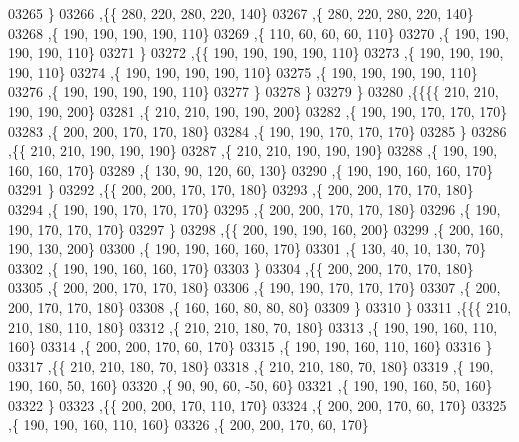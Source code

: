 \begin{DoxyCode}
03265     \}
03266    ,\{\{   280,   220,   280,   220,   140\}
03267     ,\{   280,   220,   280,   220,   140\}
03268     ,\{   190,   190,   190,   190,   110\}
03269     ,\{   110,    60,    60,    60,   110\}
03270     ,\{   190,   190,   190,   190,   110\}
03271     \}
03272    ,\{\{   190,   190,   190,   190,   110\}
03273     ,\{   190,   190,   190,   190,   110\}
03274     ,\{   190,   190,   190,   190,   110\}
03275     ,\{   190,   190,   190,   190,   110\}
03276     ,\{   190,   190,   190,   190,   110\}
03277     \}
03278    \}
03279   \}
03280  ,\{\{\{\{   210,   210,   190,   190,   200\}
03281     ,\{   210,   210,   190,   190,   200\}
03282     ,\{   190,   190,   170,   170,   170\}
03283     ,\{   200,   200,   170,   170,   180\}
03284     ,\{   190,   190,   170,   170,   170\}
03285     \}
03286    ,\{\{   210,   210,   190,   190,   190\}
03287     ,\{   210,   210,   190,   190,   190\}
03288     ,\{   190,   190,   160,   160,   170\}
03289     ,\{   130,    90,   120,    60,   130\}
03290     ,\{   190,   190,   160,   160,   170\}
03291     \}
03292    ,\{\{   200,   200,   170,   170,   180\}
03293     ,\{   200,   200,   170,   170,   180\}
03294     ,\{   190,   190,   170,   170,   170\}
03295     ,\{   200,   200,   170,   170,   180\}
03296     ,\{   190,   190,   170,   170,   170\}
03297     \}
03298    ,\{\{   200,   190,   190,   160,   200\}
03299     ,\{   200,   160,   190,   130,   200\}
03300     ,\{   190,   190,   160,   160,   170\}
03301     ,\{   130,    40,    10,   130,    70\}
03302     ,\{   190,   190,   160,   160,   170\}
03303     \}
03304    ,\{\{   200,   200,   170,   170,   180\}
03305     ,\{   200,   200,   170,   170,   180\}
03306     ,\{   190,   190,   170,   170,   170\}
03307     ,\{   200,   200,   170,   170,   180\}
03308     ,\{   160,   160,    80,    80,    80\}
03309     \}
03310    \}
03311   ,\{\{\{   210,   210,   180,   110,   180\}
03312     ,\{   210,   210,   180,    70,   180\}
03313     ,\{   190,   190,   160,   110,   160\}
03314     ,\{   200,   200,   170,    60,   170\}
03315     ,\{   190,   190,   160,   110,   160\}
03316     \}
03317    ,\{\{   210,   210,   180,    70,   180\}
03318     ,\{   210,   210,   180,    70,   180\}
03319     ,\{   190,   190,   160,    50,   160\}
03320     ,\{    90,    90,    60,   -50,    60\}
03321     ,\{   190,   190,   160,    50,   160\}
03322     \}
03323    ,\{\{   200,   200,   170,   110,   170\}
03324     ,\{   200,   200,   170,    60,   170\}
03325     ,\{   190,   190,   160,   110,   160\}
03326     ,\{   200,   200,   170,    60,   170\}

\end{DoxyCode}
